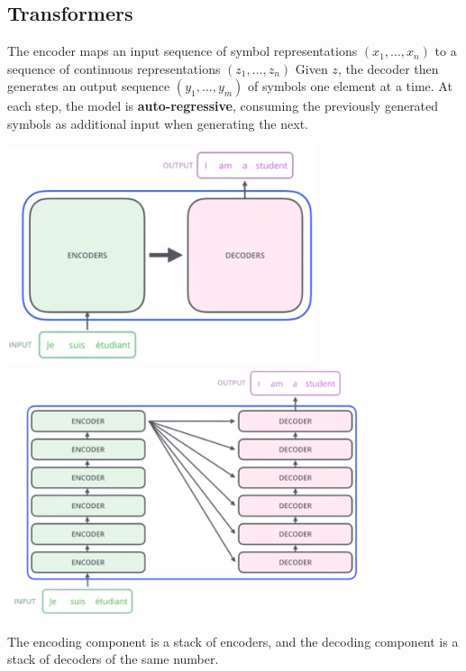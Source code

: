 \documentclass[10pt]{report}
\begin{document}
\subsection{Transformers}
The encoder maps an input sequence of symbol representations $(x_1,\ldots,x_n)$ to a sequence of continuous representations $(z_1,\ldots,z_n)$ Given $z$, the decoder then generates an output sequence $(y_1,\ldots,y_m)$ of symbols one element at a time. At each step, the model is \textbf{auto-regressive}, consuming the previously generated symbols as additional input when generating the next.
\begin{center}
	\includegraphics[scale=0.5]{70.png} \includegraphics[scale=0.5]{71.png}
\end{center}
The encoding component is a stack of encoders, and the decoding component is a stack of decoders of the same number.
\end{document}

